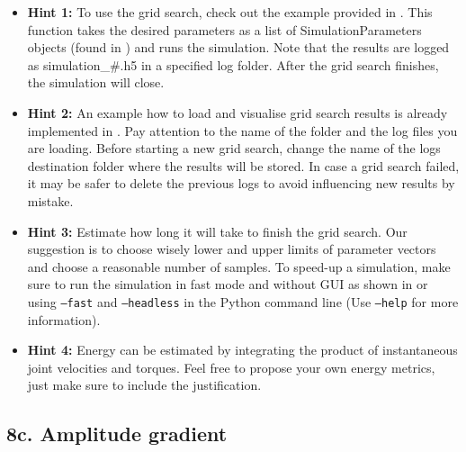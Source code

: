 \documentclass{cmc}
\begin{document}
\begin{itemize}
\item \textbf{Hint 1:} To use the grid search, check out the example provided in
  . This function takes the desired parameters as a
  list of SimulationParameters objects (found in
  ) and runs the simulation. Note that the
  results are logged as simulation\_\#.h5 in a specified log folder. After the
  grid search finishes, the simulation will close.
\item \textbf{Hint 2:} An example how to load and visualise grid search results
  is already implemented in . Pay attention to
  the name of the folder and the log files you are loading. Before starting a
  new grid search, change the name of the logs destination folder where the
  results will be stored. In case a grid search failed, it may be safer to
  delete the previous logs to avoid influencing new results by mistake.
\item \textbf{Hint 3:} Estimate how long it will take to finish the grid
  search. Our suggestion is to choose wisely lower and upper limits of parameter
  vectors and choose a reasonable number of samples. To speed-up a simulation,
  make sure to run the simulation in fast mode and without GUI as shown in
   or using \texttt{--fast} and \texttt{--headless}
  in the Python command line (Use \texttt{--help} for more information).
\item \textbf{Hint 4:} Energy can be estimated by integrating the product of
  instantaneous joint velocities and torques. Feel free to propose your own
  energy metrics, just make sure to include the justification.
\end{itemize}


\subsection*{8c. Amplitude gradient}
\label{sec:amplitude-gradient}
\end{document}
